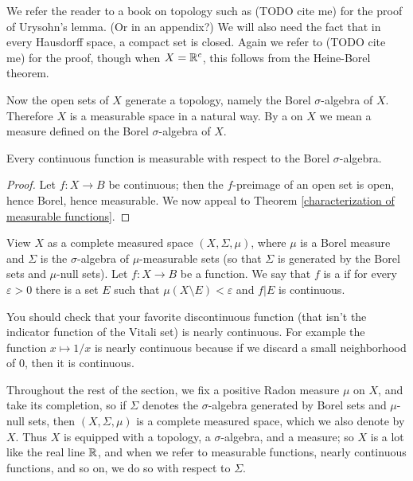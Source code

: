 \begin{subsec}
We refer the reader to a book on topology such as (TODO cite me) for the proof of Urysohn's lemma. (Or in an appendix?)
We will also need the fact that in every Hausdorff space, a compact set is closed. Again we refer to (TODO cite me) for the proof, though when $X = \mathbb{R}^c$, this follows from the Heine-Borel theorem.
\end{subsec}

\begin{subsec}
Now the open sets of $X$ generate a topology, namely the Borel $\sigma$-algebra of $X$. Therefore $X$ is a measurable space in a natural way.
By a  on $X$ we mean a measure defined on the Borel $\sigma$-algebra of $X$.
\end{subsec}

\begin{lemma}
Every continuous function is measurable with respect to the Borel $\sigma$-algebra.
\end{lemma}
\begin{proof}
Let $f: X \to B$ be continuous; then the $f$-preimage of an open set is open, hence Borel, hence measurable.
We now appeal to Theorem \ref{characterization of measurable functions}.
\end{proof}

\begin{definition}
View $X$ as a complete measured space $(X, \Sigma, \mu)$, where $\mu$ is a Borel measure and $\Sigma$ is the $\sigma$-algebra of $\mu$-measurable sets (so that $\Sigma$ is generated by the Borel sets and $\mu$-null sets).
Let $f: X \to B$ be a function.
We say that $f$ is a  if for every $\varepsilon > 0$ there is a set $E$ such that $\mu(X \setminus E) < \varepsilon$ and $f|E$ is continuous.
\end{definition}

\begin{subsec}
You should check that your favorite discontinuous function (that isn't the indicator function of the Vitali set) is nearly continuous.
For example the function $x \mapsto 1/x$ is nearly continuous because if we discard a small neighborhood of $0$, then it is continuous.
\end{subsec}

\begin{subsec}
Throughout the rest of the section, we fix a positive Radon measure $\mu$ on $X$, and take its completion, so if $\Sigma$ denotes the $\sigma$-algebra generated by Borel sets and $\mu$-null sets, then $(X, \Sigma, \mu)$ is a complete measured space, which we also denote by $X$.
Thus $X$ is equipped with a topology, a $\sigma$-algebra, and a measure; so $X$ is a lot like the real line $\mathbb{R}$, and when we refer to measurable functions, nearly continuous functions, and so on, we do so with respect to $\Sigma$.
\end{subsec}

